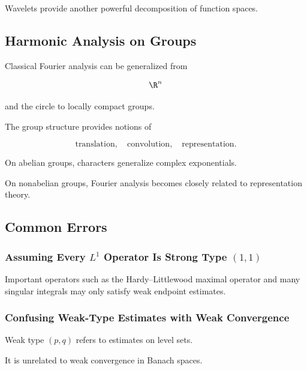 Wavelets provide another powerful decomposition of function spaces.

\subsection{Harmonic Analysis on Groups}
\label{subsec:harmonic-analysis-groups}

Classical Fourier analysis can be generalized from

\[
\R^n
\]

and the circle to locally compact groups.

The group structure provides notions of

\[
\boxed{
\text{translation},
\quad
\text{convolution},
\quad
\text{representation}.
}
\]

On abelian groups, characters generalize complex exponentials.

On nonabelian groups, Fourier analysis becomes closely related to
representation theory.

\subsection{Common Errors}
\label{subsec:harmonic-analysis-common-errors}

\subsubsection{Assuming Every \(L^1\) Operator Is Strong Type \((1,1)\)}

Important operators such as the Hardy--Littlewood maximal operator and
many singular integrals may only satisfy weak endpoint estimates.

\subsubsection{Confusing Weak-Type Estimates with Weak Convergence}

Weak type \((p,q)\) refers to estimates on level sets.

It is unrelated to weak convergence in Banach spaces.

